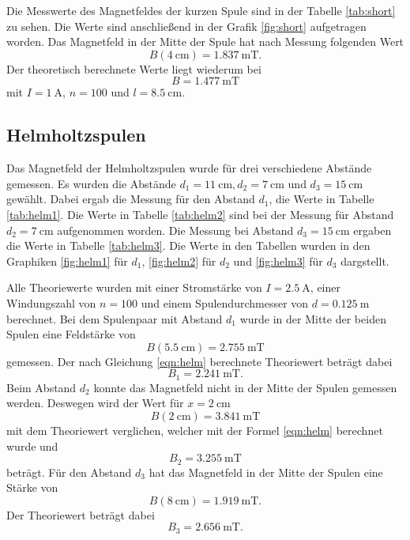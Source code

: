 Die Messwerte des Magnetfeldes der kurzen Spule sind in der Tabelle \ref{tab:short} zu sehen.
Die Werte sind anschließend in der Grafik \ref{fig:short} aufgetragen worden.
Das Magnetfeld in der Mitte der Spule hat nach Messung folgenden Wert
\begin{equation*}
  B(\SI{4}{\centi\meter})=\SI{1.837}{\milli\tesla} .
\end{equation*}
Der theoretisch berechnete Werte liegt wiederum bei
\begin{equation*}
  B = \SI{1.477}{\milli\tesla}
\end{equation*}
mit $I=\SI{1}{\ampere}$, $n=100$ und $l=\SI{8.5}{\centi\meter}$.
\FloatBarrier

\subsection{Helmholtzspulen}

Das Magnetfeld der Helmholtzspulen wurde für drei verschiedene Abstände gemessen.
Es wurden die Abstände $d_1=\SI{11}{\centi\metre}, d_2=\SI{7}{\centi\metre}$ und $d_3=\SI{15}{\centi\metre}$ gewählt.
Dabei ergab die Messung für den Abstand $d_1$, die Werte in Tabelle \ref{tab:helm1}.
Die Werte in Tabelle \ref{tab:helm2} sind bei der Messung für Abstand $d_2=\SI{7}{\centi\metre}$ aufgenommen worden.
Die Messung bei Abstand $d_3=\SI{15}{\centi\metre}$ ergaben die Werte in Tabelle \ref{tab:helm3}.
Die Werte in den Tabellen wurden in den Graphiken \ref{fig:helm1} für $d_1$, \ref{fig:helm2} für $d_2$ und \ref{fig:helm3} für $d_3$ dargstellt.

Alle Theoriewerte wurden mit einer Stromstärke von $I=\SI{2.5}{\ampere}$, einer Windungszahl von $n=100$ und einem Spulendurchmesser von $d=\SI{0.125}{\meter}$ berechnet.
Bei dem Spulenpaar mit Abstand $d_1$ wurde in der Mitte der beiden Spulen eine Feldstärke von 
\begin{equation*}
  B(\SI{5.5}{\centi\meter}) =\SI{2.755}{\milli\tesla}
\end{equation*}
gemessen.
Der nach Gleichung \eqref{eqn:helm} berechnete Theoriewert beträgt dabei
\begin{equation*}
  B_1=\SI{2.241}{\milli\tesla} .
\end{equation*}
Beim Abstand $d_2$ konnte das Magnetfeld nicht in der Mitte der Spulen gemessen werden.
Deswegen wird der Wert für $x=\SI{2}{\centi\meter}$
\begin{equation*}
  B(\SI{2}{\centi\meter})=\SI{3.841}{\milli\tesla}
\end{equation*}
mit dem Theoriewert verglichen, welcher mit der Formel \eqref{eqn:helm} berechnet wurde und 
\begin{equation*}
  B_2 =\SI{3.255}{\milli\tesla}
\end{equation*}
beträgt.
Für den Abstand $d_3$ hat das Magnetfeld in der Mitte der Spulen eine Stärke von 
\begin{equation*}
  B(\SI{8}{\centi\meter})=\SI{1.919}{\milli\tesla} .
\end{equation*}
Der Theoriewert beträgt dabei 
\begin{equation*}
  B_3=\SI{2.656}{\milli\tesla}.
\end{equation*}

